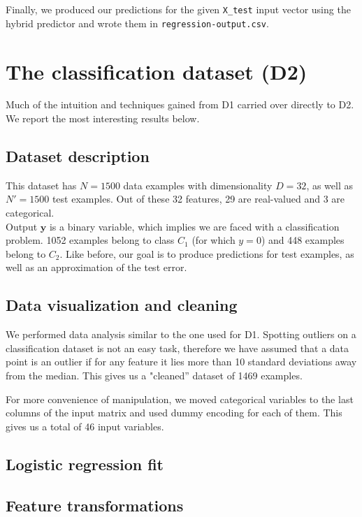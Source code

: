 \documentclass{article} %
\begin{document}
  Finally, we produced our predictions for the given \texttt{X\_test} input vector using the hybrid predictor and wrote them in \texttt{regression-output.csv}.

\section{The classification dataset (D2)}
  Much of the intuition and techniques gained from D1 carried over directly to D2. We report the most interesting results below.

  \subsection{Dataset description}
  This dataset has $N = 1500$ data examples with dimensionality $D = 32$, as well as $N' = 1500$ test examples. Out of these 32 features, 29 are real-valued and 3 are categorical.\\
  Output $\mathbf{y}$ is a binary variable, which implies we are faced with a classification problem. 1052 examples belong to class $C_1$ (for which $y = 0$) and 448 examples belong to $C_2$. Like before, our goal is to produce predictions for test examples, as well as an approximation of the test error.

  \subsection{Data visualization and cleaning}
  We performed data analysis similar to the one used for D1. Spotting outliers on a classification dataset is not an easy task, therefore we have assumed that a data point is an outlier if for any feature it lies more than 10 standard deviations away from the median. This gives us a "cleaned'' dataset of 1469 examples.

  For more convenience of manipulation, we moved categorical variables to the last columns of the input matrix and used dummy encoding for each of them. This gives us a total of 46 input variables.

  \subsection{Logistic regression fit}

  \subsection{Feature transformations}
\end{document}
